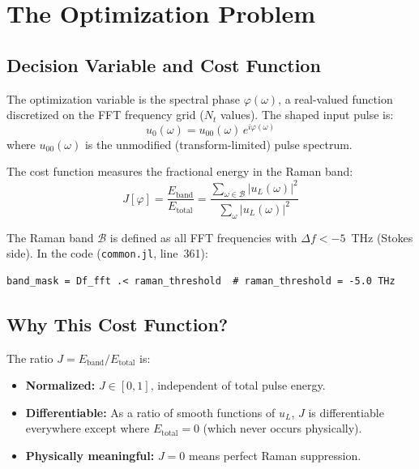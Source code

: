 \documentclass[12pt,a4paper]{article}
\theoremstyle{definition}
\begin{document}
\section{The Optimization Problem}
\label{sec:optimization}

\subsection{Decision Variable and Cost Function}

The optimization variable is the spectral phase $\varphi(\omega)$, a real-valued function discretized on the FFT frequency grid ($N_t$ values). The shaped input pulse is:
\begin{equation}
u_0(\omega) = u_{00}(\omega)\,e^{i\varphi(\omega)}
\label{eq:phase_mask}
\end{equation}
where $u_{00}(\omega)$ is the unmodified (transform-limited) pulse spectrum.

The cost function measures the fractional energy in the Raman band:
\begin{equation}
\boxed{J[\varphi] = \frac{E_{\text{band}}}{E_{\text{total}}} = \frac{\sum_{\omega \in \mathcal{B}}|u_L(\omega)|^2}{\sum_\omega |u_L(\omega)|^2}}
\label{eq:cost}
\end{equation}

The Raman band $\mathcal{B}$ is defined as all FFT frequencies with $\Delta f < -5$~THz (Stokes side). In the code (\texttt{common.jl}, line~361):
\begin{lstlisting}
band_mask = Df_fft .< raman_threshold  # raman_threshold = -5.0 THz
\end{lstlisting}

\subsection{Why This Cost Function?}

The ratio $J = E_{\text{band}}/E_{\text{total}}$ is:
\begin{itemize}[leftmargin=*]
\item \textbf{Normalized:} $J \in [0,1]$, independent of total pulse energy.
\item \textbf{Differentiable:} As a ratio of smooth functions of $u_L$, $J$ is differentiable everywhere except where $E_{\text{total}} = 0$ (which never occurs physically).
\item \textbf{Physically meaningful:} $J=0$ means perfect Raman suppression.
\end{itemize}
\end{document}
